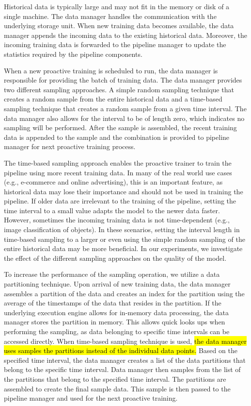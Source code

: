 Historical data is typically large and may not fit in the memory or disk of a single machine. 
The data manager handles the communication with the underlying storage unit.
When new training data becomes available, the data manager appends the incoming data to the existing historical data.
Moreover, the incoming training data is forwarded to the pipeline manager to update the statistics required by the pipeline components.

When a new proactive training is scheduled to run, the data manager is responsible for providing the batch of training data.
The data manager provides two different sampling approaches.
A simple random sampling technique that creates a random sample from the entire historical data and a time-based sampling technique that creates a random sample from a given time interval.
The data manager also allows for the interval to be of length zero, which indicates no sampling will be performed.
After the sample is assembled, the recent training data is appended to the sample and the combination is provided to pipeline manager for next proactive training process.

The time-based sampling approach enables the proactive trainer to train the pipeline using more recent training data.
In many of the real world use cases (e.g., e-commerce and online advertising), this is an important feature, as historical data may lose their importance and should not be used in training the pipeline.
If older data are irrelevant to the training of the pipeline, setting the time interval to a small value adapts the model to the newer data faster.
However, sometimes the incoming training data is not time-dependent (e.g., image classification of objects).
In these scenarios, setting the interval length in time-based sampling to a larger or even using the simple random sampling of the entire historical data may be more beneficial.
In our experiments, we investigate the effect of the different sampling approaches on the quality of the model.

To increase the performance of the sampling operation, we utilize a data partitioning technique.
Upon arrival of new training data, the data manager assembles a partition of the data and creates an index for the partition using the average of the timestamps of the data that resides in the partition.
If the underlying execution engine allows for in-memory data processing, the data manager stores the partition in memory.
This allows quick looks ups when performing the sampling, as data belonging to specific time intervals can be accessed directly.
When time-based sampling technique is used, \hl{the data manager uses samples the partitions instead of the individual data points.}
Based on the specified time interval, the data manager creates a list of the data partitions that belong to the specific time interval.
Data manager then samples from the list of the partitions that belong to the specified time interval.
The partitions are assembled to create the final sample data.
This sample is then passed to the pipeline manager and used for the next proactive training.

